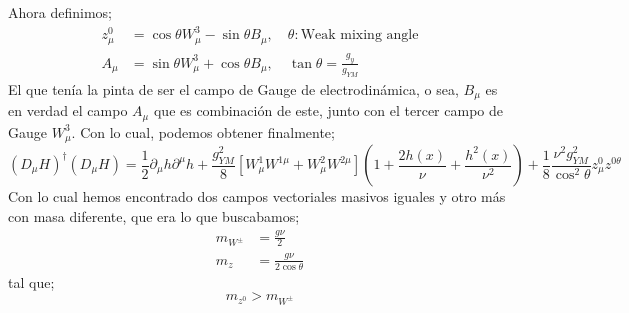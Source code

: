 \documentclass[../main.tex]{subfiles}
\begin{document}
Ahora definimos;
\begin{align}
  z^0_\mu & = \cos{\theta}W^3_\mu - \sin{\theta}B_\mu, \quad \theta: \text{Weak mixing angle} \\
  A_\mu & = \sin{\theta}W^3_\mu + \cos{\theta}B_\mu, \quad \tan{\theta} = \frac{g_{y}}{g_{YM}}
\end{align}
El que tenía la pinta de ser el campo de Gauge de electrodinámica, o sea, $B_\mu$ es en verdad el campo $A_\mu$ que es combinación de este, junto con el tercer campo de Gauge $W^3_\mu$.  
Con lo cual, podemos obtener finalmente;
\begin{equation}
  \left( D_\mu H \right)^\dagger \left( D_\mu H  \right) = \frac{1}{2}\partial_\mu h \partial^\mu h + \frac{g_{YM}^2}{8} \left[ W^1_\mu W^{1\mu} + W^2_\mu W^{2\mu} \right] \left( 1 + \frac{2h(x)}{\nu} + \frac{h^2(x)}{\nu^2} \right) + \frac{1}{8} \frac{\nu^2g_{YM}^2}{\cos^2{\theta}} z^0_\mu z^{0\theta}
 \end{equation}
 Con lo cual hemos encontrado dos campos vectoriales masivos iguales y otro más con masa diferente, que era lo que buscabamos;
 \begin{align*}
   m_{W^\pm} & = \frac{g\nu}{2} \\
   m_z & = \frac{g\nu}{2\cos{\theta}}
 \end{align*}
tal que;
\begin{equation}
  m_{z^0} > m_{W^\pm}
 \end{equation}
\end{document}
